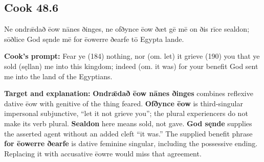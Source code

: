 \par\begin{minipage}{\linewidth}\raggedright
\subsection*{Cook 48.6}

Ne ondrǣdað ēow nānes ðinges, ne ofðynce ēow ðæt gē mē on ðis rīce sealdon; sōðlice God sęnde mē for ēowerre ðearfe tō Egypta lande.

\textbf{Cook’s prompt:} Fear ye (184) nothing, nor (om. let) it grieve (190) you that ye sold (sęllan) me into this kingdom; indeed (om. it was) for your benefit God sent me into the land of the Egyptians.

\textbf{Target and explanation:} \textbf{Ondrǣdað ēow nānes ðinges} combines reflexive dative ēow with genitive of the thing feared. \textbf{Ofðynce ēow} is third-singular impersonal subjunctive, “let it not grieve you”; the plural experiencers do not make its verb plural. \textbf{Sealdon} here means sold, not gave. \textbf{God sęnde} supplies the asserted agent without an added cleft “it was.” The supplied benefit phrase \textbf{for ēowerre ðearfe} is dative feminine singular, including the possessive ending. Replacing it with accusative ēowre would miss that agreement.

\end{minipage}\par\addvspace{4pt}

